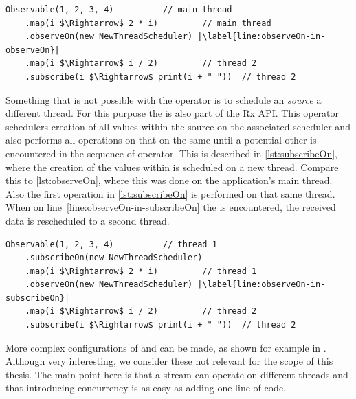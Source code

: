 \begin{minipage}{\linewidth}
\begin{lstlisting}[style=ScalaStyle, caption={\code{observeOn} in a Rx sequence}, label={lst:observeOn}]
Observable(1, 2, 3, 4)			// main thread
    .map(i $\Rightarrow$ 2 * i)			// main thread
    .observeOn(new NewThreadScheduler) |\label{line:observeOn-in-observeOn}|
    .map(i $\Rightarrow$ i / 2)			// thread 2
    .subscribe(i $\Rightarrow$ print(i + " "))	// thread 2
\end{lstlisting}
\end{minipage}

Something that is not possible with the  operator is to schedule an \obs \textit{source} a different thread. For this purpose the  is also part of the Rx API. This operator schedulers creation of all values within the source on the associated scheduler and also performs all operations on that \obs on the same \sch until a potential other \sch is encountered in the sequence of operator. This is described in \autoref{lst:subscribeOn}, where the creation of the values within  is scheduled on a new thread. Compare this to \autoref{lst:observeOn}, where this was done on the application's main thread. Also the first  operation in \autoref{lst:subscribeOn} is performed on that same thread. When on line~\ref{line:observeOn-in-subscribeOn} the  is encountered, the received data is rescheduled to a second thread.

\begin{minipage}{\linewidth}
\begin{lstlisting}[style=ScalaStyle, caption={\code{subscribeOn} in a Rx sequence}, label={lst:subscribeOn}]
Observable(1, 2, 3, 4)			// thread 1
    .subscribeOn(new NewThreadScheduler)
    .map(i $\Rightarrow$ 2 * i)			// thread 1
    .observeOn(new NewThreadScheduler) |\label{line:observeOn-in-subscribeOn}|
    .map(i $\Rightarrow$ i / 2)			// thread 2
    .subscribe(i $\Rightarrow$ print(i + " "))	// thread 2
\end{lstlisting}
\end{minipage}

More complex configurations of  and  can be made, as shown for example in \cite{RxJava-Scheduling}. Although very interesting, we consider these not relevant for the scope of this thesis. The main point here is that a stream can operate on different threads and that introducing concurrency is as easy as adding one line of code.